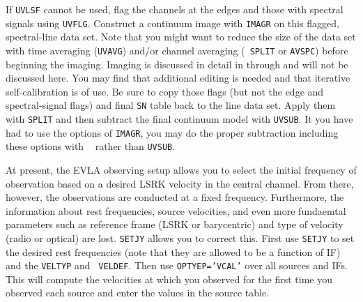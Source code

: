 
If {\tt UVLSF} cannot be used, flag the channels at the edges and
those with spectral signals using {\tt UVFLG}\@.  Construct a
continuum image with {\tt IMAGR} on this flagged, spectral-line data
set.  Note that you might want to reduce the size of the data set
with time averaging ({\tt UVAVG}) and/or channel averaging ({\tt
SPLIT} or {\tt AVSPC}) before beginning the imaging.  Imaging is
discussed in detail in  through  and will not
be discussed here.  You may find that additional editing is needed and
that iterative self-calibration is of use.  Be sure to copy those
flags (but not the edge and spectral-signal flags) and final {\tt SN}
table back to the line data set.  Apply them with {\tt SPLIT} and then
subtract the final continuum model with {\tt UVSUB}\@.  It you have
had to use the  options of {\tt IMAGR}, you may
do the proper subtraction including these options with {\tt
{}} rather than {\tt UVSUB}\@.

At present, the EVLA observing setup allows you to select the initial
frequency of observation based on a desired LSRK velocity in the
central channel.  From there, however, the observations are conducted
at a fixed frequency.  Furthermore, the information about rest
frequencies, source velocities, and even more fundaemtal parameters
such as reference frame (LSRK or barycentric) and type of velocity
(radio or optical) are lost.  {\tt SETJY} allows you to correct this.
First use {\tt SETJY} to set the desired rest frequencies (note that
they are allowed to be a function of IF) and the {\tt VELTYP} and {\tt
VELDEF}\@.  Then use {\tt OPTYEP='VCAL'} over all sources and IFs.
This will compute the velocities at which you observed for the first
time you observed each source and enter the values in the source
table.

